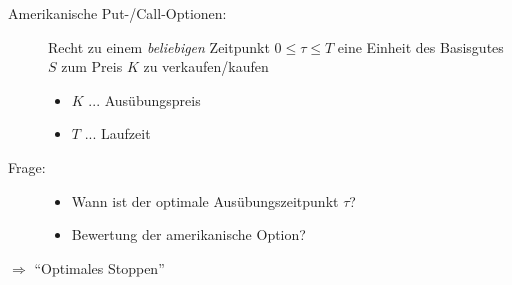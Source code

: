 \begin{description}
	\item[Amerikanische Put-/Call-Optionen:] Recht zu einem \textit{beliebigen} Zeitpunkt $0 \le \tau \le T$ eine Einheit des Basisgutes $S$ zum Preis $K$ zu verkaufen/kaufen
	\begin{itemize}[nolistsep, topsep=-\parskip]
		\item $K$ ... Ausübungspreis
		\item $T$ ... Laufzeit
	\end{itemize}
	\item[Frage:]
	\begin{itemize}[nolistsep]
		\item Wann ist der optimale Ausübungszeitpunkt $\tau$?
		\item Bewertung der amerikanische Option?
	\end{itemize}
\end{description}

$\Longrightarrow$ \enquote{Optimales Stoppen}